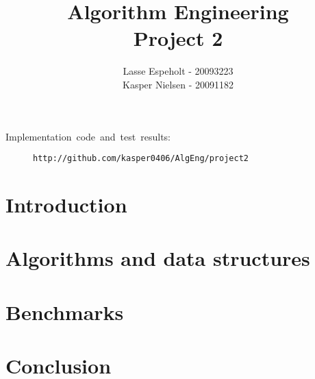 \documentclass[a4paper,12pt]{article}
\begin{document}
\title{Algorithm Engineering\\Project 2}

\author{Lasse Espeholt - 20093223\\
Kasper Nielsen - 20091182}

\maketitle
\vfill{}
\begin{description}
\item [{Implementation~code~and~test~results:}] \texttt{http://github.com/kasper0406/AlgEng/project2}
\end{description}
\pagebreak{}\tableofcontents{}\pagebreak{}

\section{Introduction}


\section{Algorithms and data structures}


\section{Benchmarks}


\section{Conclusion}

\end{document}
